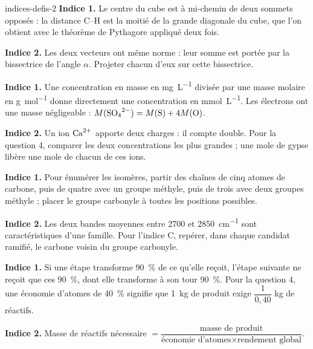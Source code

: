 \begin{blocEdition}{indices-defis-2}
\textbf{Indice 1.} Le centre du cube est à mi-chemin de deux sommets opposés : la distance C--H est la moitié de la
grande diagonale du cube, que l'on obtient avec le théorème de Pythagore appliqué deux fois.\par\smallskip
\textbf{Indice 2.} Les deux vecteurs ont même norme : leur somme est portée par la bissectrice de l'angle $\alpha$. Projeter
chacun d'eux sur cette bissectrice.\par\smallskip
{}
\textbf{Indice 1.} Une concentration en masse en \unit{mg.L^{-1}} divisée par une masse molaire en \unit{g.mol^{-1}} donne directement une
concentration en \unit{mmol.L^{-1}}. Les électrons ont une masse négligeable : $M(\ce{SO4^{2-}})=M(\ce{S})+4M(\ce{O})$.\par\smallskip
\textbf{Indice 2.} Un ion $\ce{Ca^{2+}}$ apporte deux charges : il compte double. Pour la question 4, comparer les deux concentrations
les plus grandes ; une mole de gypse libère une mole de chacun de ces ions.\par\smallskip
{}
\textbf{Indice 1.} Pour énumérer les isomères, partir des chaînes de cinq atomes de carbone, puis de quatre avec un groupe
méthyle, puis de trois avec deux groupes méthyle ; placer le groupe carbonyle à toutes les positions possibles.\par\smallskip
\textbf{Indice 2.} Les deux bandes moyennes entre 2700 et \qty{2850}{cm^{-1}} sont caractéristiques d'une famille. Pour l'indice C,
repérer, dans chaque candidat ramifié, le carbone voisin du groupe carbonyle.\par\smallskip
{}
\textbf{Indice 1.} Si une étape transforme \qty{90}{\percent} de ce qu'elle reçoit, l'étape suivante ne reçoit que ces \qty{90}{\percent}, dont elle
transforme à son tour \qty{90}{\percent}. Pour la question 4, une économie d'atomes de \qty{40}{\percent} signifie que \qty{1}{kg} de produit exige
$\dfrac{1}{0{,}40}$ kg de réactifs.\par\smallskip
\textbf{Indice 2.} Masse de réactifs nécessaire $=\dfrac{\text{masse de produit}}{\text{économie d'atomes}\times\text{rendement global}}$.\par\smallskip
\end{blocEdition}

